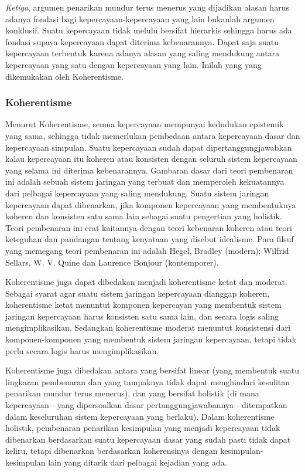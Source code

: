\documentclass[10pt,a4paper]{article}
\begin{document}
\begin{multicols}{2}
\emph{Ketiga}, argumen penarikan mundur terus menerus yang dijadikan
alasan harus adanya fondasi bagi kepercayaan-kepercayaan yang lain
bukanlah argumen konklusif. Suatu kepercayaan tidak melulu bersifat
hierarkis sehingga harus ada fondasi supaya kepercayaan dapat diterima
kebenarannya. Dapat saja suatu kepercayaan terbentuk karena adanya
alasan yang saling mendukung antara kepercayaan yang satu dengan
kepercayaan yang lain. Inilah yang yang dikemukakan oleh Koherentisme.

\hypertarget{koherentisme}{%
\subsubsection{Koherentisme}\label{koherentisme}}

Menurut Koherentisme, semua kepercayaan mempunyai kedudukan epistemik
yang sama, sehingga tidak memerlukan pembedaan antara kepercayaan dasar
dan kepercayaan simpulan. Suatu kepercayaan sudah dapat
dipertanggungjawabkan kalau kepercayaan itu koheren atau konsisten
dengan seluruh sistem kepercayaan yang selama ini diterima kebenarannya.
Gambaran dasar dari teori pembenaran ini adalah sebuah sistem jaringan
yang terbuat dan memperoleh kekuatannya dari pelbagai kepercayaan yang
saling mendukung. Suatu sistem jaringan kepercayaan dapat dibenarkan,
jika komponen kepercayaan yang membentuknya koheren dan konsisten satu
sama lain sebagai suatu pengertian yang holistik. Teori pembenaran ini
erat kaitannya dengan teori kebenaran koheren atau teori keteguhan dan
pandangan tentang kenyataan yang disebut idealisme. Para filsuf yang
memegang teori pembenaran ini adalah Hegel, Bradley (modern); Wilfrid
Sellars, W. V. Quine dan Laurence Bonjour (kontemporer).

Koherentisme juga dapat dibedakan menjadi koherentisme ketat dan
moderat. Sebagai syarat agar suatu sistem jaringan kepercayaan dianggap
koheren, koherentisme ketat menuntut komponen kepercayan yang membentuk
sistem jaringan kepercayaan harus konsisten satu sama lain, dan secara
logis saling mengimplikasikan. Sedangkan koherentisme moderat menuntut
konsistensi dari komponen-komponen yang membentuk sistem jaringan
kepercayaan, tetapi tidak perlu secara logis harus mengimplikasikan.

Koherentisme juga dibedakan antara yang bersifat linear (yang membentuk
suatu lingkaran pembenaran dan yang tampaknya tidak dapat menghindari
kesulitan penarikan mundur terus menerus), dan yang bersifat holistik
(di mana kepercayaan---yang dipersoalkan dasar
pertanggungjawabannya---ditempatkan dalam keseluruhan sistem kepercayaan
yang berlaku). Dalam koherentisme holistik, pembenaran penarikan
kesimpulan yang menjadi kepercayaan tidak dibenarkan berdasarkan suatu
kepercayaan dasar yang sudah pasti tidak dapat keliru, tetapi dibenarkan
berdasarkan koherensinya dengan kesimpulan-kesimpulan lain yang ditarik
dari pelbagai kejadian yang ada.


\end{multicols}
\end{document}
